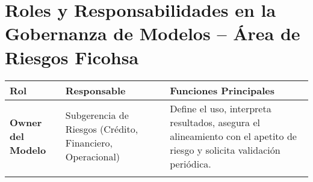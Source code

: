 \documentclass{article}
\begin{document}
\section*{Roles y Responsabilidades en la Gobernanza de Modelos – Área de Riesgos Ficohsa}

\begin{longtable}{>{\bfseries}p{3.5cm} p{4cm} p{7cm}}
\toprule
\rowcolor{blue!20}
Rol & Responsable & Funciones Principales \\
\midrule
Owner del Modelo & Subgerencia de Riesgos (Crédito, Financiero, Operacional) & 
Define el uso, interpreta resultados, asegura el alineamiento con el apetito de riesgo y solicita validación periódica. \\
\addlinespace

\bottomrule
\end{longtable}
\end{document}
